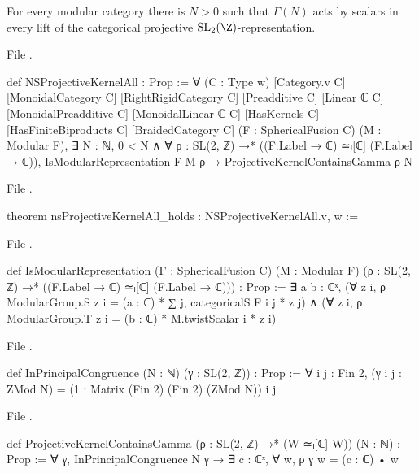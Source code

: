 \begin{theorem}\label{l21:thm:ns}
For every modular category there is $N>0$ such that $\Gamma(N)$ acts by scalars in every lift of the categorical projective
$\ltwooneSL(\Z)$-representation.
\end{theorem}
\noindent File .
\begin{leancode}
def NSProjectiveKernelAll : Prop :=
  ∀ (C : Type w) [Category.{v} C] [MonoidalCategory C] [RightRigidCategory C]
    [Preadditive C] [Linear ℂ C] [MonoidalPreadditive C] [MonoidalLinear ℂ C]
    [HasKernels C] [HasFiniteBiproducts C] [BraidedCategory C]
    (F : SphericalFusion C) (M : Modular F),
    ∃ N : ℕ, 0 < N ∧ ∀ ρ : SL(2, ℤ) →* ((F.Label → ℂ) ≃ₗ[ℂ] (F.Label → ℂ)),
      IsModularRepresentation F M ρ → ProjectiveKernelContainsGamma ρ N
\end{leancode}
\noindent File .
\begin{leancode}
theorem nsProjectiveKernelAll_holds : NSProjectiveKernelAll.{v, w} :=
\end{leancode}

\noindent File .
\begin{leancode}
def IsModularRepresentation (F : SphericalFusion C) (M : Modular F)
    (ρ : SL(2, ℤ) →* ((F.Label → ℂ) ≃ₗ[ℂ] (F.Label → ℂ))) : Prop :=
  ∃ a b : ℂˣ,
    (∀ z i, ρ ModularGroup.S z i = (a : ℂ) * ∑ j, categoricalS F i j * z j) ∧
    (∀ z i, ρ ModularGroup.T z i = (b : ℂ) * M.twistScalar i * z i)
\end{leancode}
\noindent File .
\begin{leancode}
def InPrincipalCongruence (N : ℕ) (γ : SL(2, ℤ)) : Prop :=
  ∀ i j : Fin 2, (γ i j : ZMod N) = (1 : Matrix (Fin 2) (Fin 2) (ZMod N)) i j
\end{leancode}
\noindent File .
\begin{leancode}
def ProjectiveKernelContainsGamma (ρ : SL(2, ℤ) →* (W ≃ₗ[ℂ] W)) (N : ℕ) : Prop :=
  ∀ γ, InPrincipalCongruence N γ → ∃ c : ℂˣ, ∀ w, ρ γ w = (c : ℂ) • w
\end{leancode}

